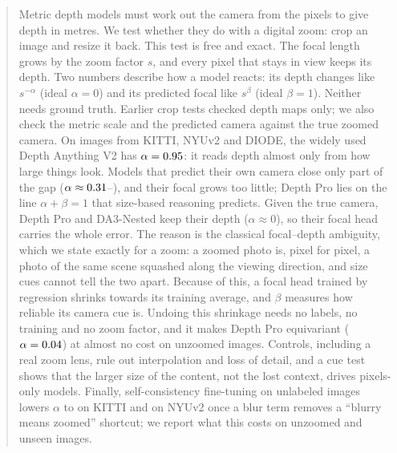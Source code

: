 \begin{abstract}
Metric depth models must work out the camera from the pixels to give depth in metres. We test whether they do
with a digital zoom: crop an image and resize it back. This test is free and exact. The focal length grows by the
zoom factor $s$, and every pixel that stays in view keeps its depth. Two numbers describe how a model reacts: its
depth changes like $s^{-\alpha}$ (ideal $\alpha=0$) and its predicted focal like $s^{\beta}$ (ideal $\beta=1$).
Neither needs ground truth. Earlier crop tests checked depth maps only; we also check the metric scale and the
predicted camera against the true zoomed camera. On \nImages{} images from KITTI, NYUv2 and DIODE, the widely used
Depth Anything V2 has $\alpha=\DavTwoSAlpha$: it reads depth almost only from how large things look. Models that
predict their own camera close only part of the gap ($\alpha\approx\DepthproAlpha$--\MogeTwoSAlpha), and their focal
grows too little; Depth Pro lies on the line $\alpha+\beta=1$ that size-based reasoning predicts. Given the true
camera, Depth Pro and DA3-Nested keep their depth ($\alpha\approx0$), so their focal head carries the whole error.
The reason is the classical focal--depth ambiguity, which we state exactly for a zoom: a zoomed photo is, pixel for
pixel, a photo of the same scene squashed along the viewing direction, and size cues cannot tell the two apart.
Because of this, a focal head trained by regression shrinks towards its training average, and $\beta$ measures how
reliable its camera cue is. Undoing this shrinkage needs no labels, no training and no zoom factor, and it makes
Depth Pro equivariant ($\alpha=\DepthproUnshrinkAlphacorr$) at almost no cost on unzoomed images. Controls, including
a real zoom lens, rule out interpolation and loss of detail, and a cue test shows that the larger size of the
content, not the lost context, drives pixels-only models. Finally, self-consistency fine-tuning on unlabeled images
lowers $\alpha$ to \DavTwoSEftbKittiAlpha{} on KITTI and \DavTwoSEftbNyuAlpha{} on NYUv2 once a blur term removes a
``blurry means zoomed'' shortcut; we report what this costs on unzoomed and unseen images.
\end{abstract}

